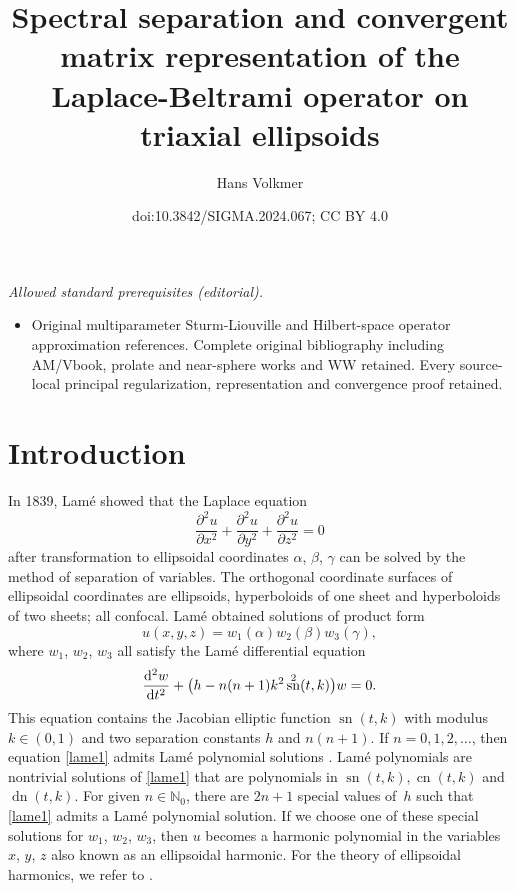 \documentclass[10pt,a4paper]{amsart}
\title{Spectral separation and convergent matrix representation of the Laplace-Beltrami operator on triaxial ellipsoids}
\author{Hans Volkmer}
\date{doi:10.3842/SIGMA.2024.067; CC BY 4.0}
\newcommand{\N}{\mathbb{N}}
\DeclareMathOperator{\sn}{sn}
\DeclareMathOperator{\cn}{cn}
\DeclareMathOperator{\dn}{dn}
\numberwithin{equation}{section}
\begin{document}
\maketitle
\noindent\textit{Allowed standard prerequisites (editorial).}\begin{itemize}
\item Original multiparameter Sturm-Liouville and Hilbert-space operator approximation references. Complete original bibliography including AM/Vbook, prolate and near-sphere works and WW retained. Every source-local principal regularization, representation and convergence proof retained.
\end{itemize}\medskip
\section{Introduction}

In 1839, Lam\'e \cite{L} showed that the Laplace equation
\[ \frac{\partial^2u}{\partial x^2}+\frac{\partial^2 u}{\partial y^2}+\frac{\partial^2 u}{\partial z^2}=0\]
after transformation to ellipsoidal coordinates $\alpha$, $\beta$, $\gamma$ \cite[Section~1.6]{A} can be solved by the method of separation of variables.
The orthogonal coordinate surfaces of ellipsoidal coordinates are ellipsoids, hyperboloids of one sheet and
hyperboloids of two sheets; all confocal.
Lam\'e obtained solutions of product form
\begin{equation*}%
 u(x,y,z)=w_1(\alpha)w_2(\beta)w_3(\gamma),
\end{equation*}
where $w_1$, $w_2$, $w_3$ all satisfy the Lam\'e differential equation
\begin{equation}\label{lame1}
\frac{{\rm d}^2w}{{\rm d}t^2}+\bigl(h-n(n+1)k^2 \sn^2(t,k)\bigr) w=0.
\end{equation}
This equation contains the Jacobian elliptic function $\sn(t,k)$ with modulus $k\in(0,1)$
and two separation constants $h$ and $n(n+1)$.
If $n=0,1,2,\dots$, then equation \eqref{lame1} admits Lam\'e polynomial solutions \cite[Chapter~IX]{A}.
Lam\'e polynomials are nontrivial solutions of \eqref{lame1} that are polynomials in $\sn(t,k), \cn(t,k)$ and $\dn(t,k)$.
For given $n\in\N_0$, there are $2n+1$ special values of~$h$ such that \eqref{lame1} admits a Lam\'e polynomial solution.
If we choose one of these special solutions for $w_1$, $w_2$, $w_3$, then $u$ becomes a harmonic polynomial in the variables $x$, $y$, $z$ also known as an ellipsoidal harmonic.
For the theory of ellipsoidal harmonics, we refer to \cite{D, H, Ho}.
\end{document}
